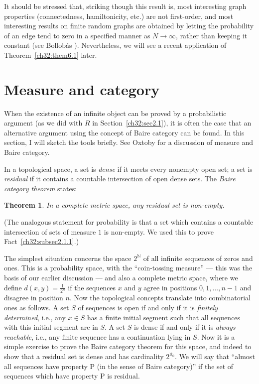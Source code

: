 \documentclass[12pt]{article}
\newtheorem{theorem}{Theorem}
\begin{document}
It should be stressed that, striking though this result is, most
interesting graph properties (connectedness, hamiltonicity, etc.)
are not first-order, and most interesting results on finite random
graphs are obtained by letting the probability of an edge tend to
zero in a specified manner as $N \rightarrow \infty$, rather than
keeping it constant (see Bollob\'{a}s \cite{ch32:bib3}).
Nevertheless, we will see a recent application of
Theorem~\ref{ch32:them6.1} later.

\section{Measure and category}%
\label{ch32:sec2.7}

When the existence of an infinite object can be proved by a
probabilistic argument (as we did with $R$ in
Section~\ref{ch32:sec2.1}), it is often the case that an
alternative argument using the concept of Baire category can be
found. In this section, I will sketch the tools briefly. See Oxtoby
\cite{ch32:bib39} for a discussion of measure and Baire category.

In a topological space, a set is \emph{dense} if it meets every nonempty
open set; a set is \emph{residual} if it contains a countable
intersection of open dense sets. The \emph{Baire category theorem}
states:

\begin{theorem}\label{ch32:them7.1} 
In a complete metric space, any residual set is non-empty.
\end{theorem}

(The analogous statement for probability is that a set which
contains a countable intersection of sets of measure $1$ is non-empty.
We used this to prove Fact~\ref{ch32:subsec2.1.1}.)

The simplest situation concerns the space $2^{\mathbb{N}}$ of all
infinite sequences of zeros and ones. This is a probability space,
with the ``coin-tossing measure'' --- this was the basis of our
earlier discussion --- and also a complete metric space, where we
define $d(x, y) = \frac{1}{2^n}$ if the sequences $x$ and $y$ agree
in positions $0, 1, \ldots, n - 1$ and disagree in position $n$.
Now the topological concepts translate into combinatorial ones as
follows. A set $S$ of sequences is open if and only if it is
\emph{finitely determined}, i.e., any $x \in S$ has a finite
initial segment such that all sequences with this initial segment
are in $S$. A set $S$ is dense if and only if it is \emph{always
reachable}, i.e., any finite sequence has a continuation lying in
$S$. Now it is a simple exercise to prove the Baire category theorem
for this space, and indeed to show that a residual set is dense and
has cardinality $2^{\aleph_0}$. We will say that ``almost all
sequences have property P (in the sense of Baire category)'' if the
set of sequences which have property P is residual.
\end{document}
